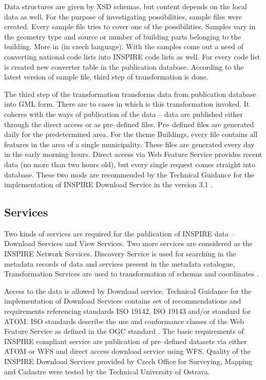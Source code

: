 \documentclass[eprint]{actapoly}
\begin{document}
Data structures are given by XSD schemas, but content depends on the local data as well. For the purpose of investigating possibilities, sample files were created. Every sample file tries to cover one of the possibilities. Samples vary in the geometry type and source or number of building parts belonging to the building. More in \cite{Med15:230877} (in czech language). With the samples come out a need of converting national code lists into INSPIRE code lists as well. For every code list is created new converter table in the publication database. According to the latest version of sample file, third step of transformation is done.

The third step of the transformation transforms data from publication database into GML form. There are to cases in which is this transformation invoked. It coheres with the ways of publication of the data -- data are published either through the direct access or as pre--defined files. Pre--defined files are generated daily for the predetermined area. For the theme Buildings, every file contains all features in the area of a single municipality. These files are generated every day in the early morning hours. Direct access via Web Feature Service provides recent data (no more than two hours old), but every single request comes straight into database. These two mods are recommended by the Technical Guidance for the implementation of INSPIRE Download Service in the version 3.1 \cite{INSPIRE:DLS}. 

\subsection{Services}

Two kinds of services are required for the publication of INSPIRE data -- Download Services and View Services. Two more services are considered as the INSPIRE Network Services. Discovery Service is used for searching in the metadata records of data and services present in the metadata catalogue, Transformation Services are used to transformation of schemas and coordinates \cite{INSPIRE:NS}.

Access to the data is allowed by Download service. Technical Guidance for the implementation of Download Services contains set of recommendations and requirements referencing standards ISO 19142, ISO 19143 and/or standard for ATOM. ISO standards describe the use and conformance classes of the Web Feature Service as defined in the OGC standard \cite{OGC:WFS}. The basic requirements of INSPIRE compliant service are publication of pre--defined datasets via either ATOM or WFS and direct access download service using WFS. Quality of the INSPIRE Download Services provided by Czech Office for Surveying, Mapping and Cadastre were tested by the Technical University of Ostrava\cite{Horak:geoinformatics10}.
\end{document}
